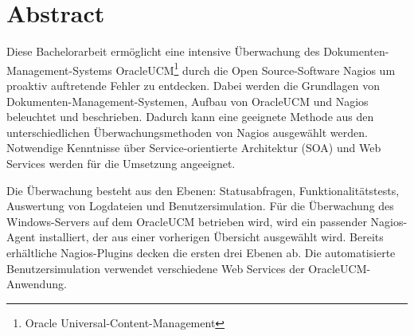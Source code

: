 \section{Abstract}

Diese Bachelorarbeit ermöglicht eine intensive Überwachung des Dokumenten-Management-Systems \gls{OracleUCM}\footnote{Oracle Universal-Content-Management} durch die Open Source-Software Nagios um proaktiv auftretende Fehler zu entdecken.
Dabei werden die Grundlagen von Dokumenten-Management-Systemen, Aufbau von \gls{OracleUCM} und Nagios beleuchtet und beschrieben.
Dadurch kann eine geeignete Methode aus den unterschiedlichen Überwachungsmethoden von Nagios ausgewählt werden.
Notwendige Kenntnisse über Service-orientierte Architektur (\gls{SOA}) und Web Services werden für die Umsetzung angeeignet.

Die Überwachung besteht aus den Ebenen: Statusabfragen, Funktionalitätstests, Auswertung von Logdateien und Benutzersimulation.
Für die Überwachung des Windows-Servers auf dem \gls{OracleUCM} betrieben wird, wird ein passender Nagios-Agent installiert, der aus einer vorherigen Übersicht ausgewählt wird.
Bereits erhältliche Nagios-Plugins decken die ersten drei Ebenen ab.
Die automatisierte Benutzersimulation verwendet verschiedene Web Services der \gls{OracleUCM}-Anwendung.




